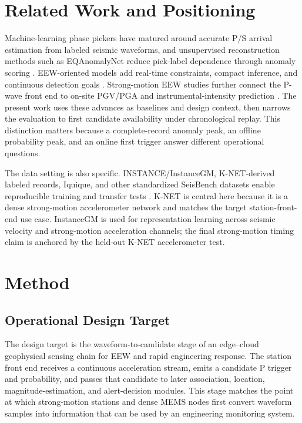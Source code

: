 \documentclass[journal]{IEEEtran}
\begin{document}
\section{Related Work and Positioning}

Machine-learning phase pickers have matured around accurate P/S arrival estimation from labeled seismic waveforms, and unsupervised reconstruction methods such as EQAnomalyNet reduce pick-label dependence through anomaly scoring \cite{zhu2019phasenet,mousavi2020earthquake,ross2018gpd,perol2018cnn,pardo2019convpicking,mousavi2019cred,soto2021deepphasepick,zhou2019wenchuan,wang2026eqanomalynet}. EEW-oriented models add real-time constraints, compact inference, and continuous detection goals \cite{munchmeyer2020team,liao2022redpan,khan2022pdetector,ravishan2026lightweight,dtpp2026,tang2026seismodual,wibowo2024indonesia}. Strong-motion EEW studies further connect the P-wave front end to on-site PGV/PGA and instrumental-intensity prediction \cite{song2021lssvmpgv,zhu2022hybridpgv,wang2023lstmtpga,li2024lstmintensity,li2024xgboostintensity}. The present work uses these advances as baselines and design context, then narrows the evaluation to first candidate availability under chronological replay. This distinction matters because a complete-record anomaly peak, an offline probability peak, and an online first trigger answer different operational questions.

The data setting is also specific. INSTANCE/InstanceGM, K-NET-derived labeled records, Iquique, and other standardized SeisBench datasets enable reproducible training and transfer tests \cite{michelini2021instance,aoi2004knet,nied2019knet,sarkar2022japan,magrini2020dataset,woollam2019iquique,woollam2022seisbench}. K-NET is central here because it is a dense strong-motion accelerometer network and matches the target station-front-end use case. InstanceGM is used for representation learning across seismic velocity and strong-motion acceleration channels; the final strong-motion timing claim is anchored by the held-out K-NET accelerometer test.

\section{Method}

\subsection{Operational Design Target}
The design target is the waveform-to-candidate stage of an edge--cloud geophysical sensing chain for EEW and rapid engineering response. The station front end receives a continuous acceleration stream, emits a candidate P trigger and probability, and passes that candidate to later association, location, magnitude-estimation, and alert-decision modules. This stage matches the point at which strong-motion stations and dense MEMS nodes first convert waveform samples into information that can be used by an engineering monitoring system.
\end{document}
